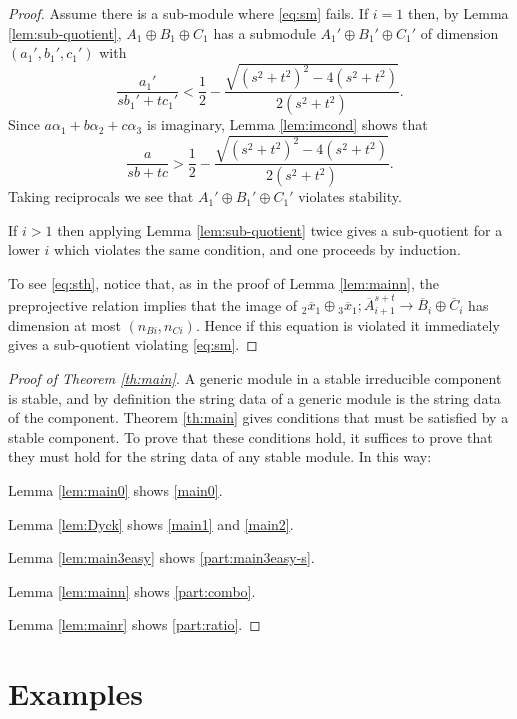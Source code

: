 \documentclass{amsart}
\numberwithin{equation}{section}
\numberwithin{figure}{section}
\numberwithin{table}{section}
\theoremstyle{definition}
\begin{document}
\begin{proof}
Assume there is a sub-module where \eqref{eq:sm} fails. 
If $i=1$ then, by Lemma \ref{lem:sub-quotient}, 
$ A_1 \oplus B_1 \oplus C_1$ has a submodule $A_1'\oplus B_1'\oplus C_1'$ of dimension $(a_1',b_1',c_1')$ with 
 $$\frac{a_1'}{sb_1'+tc_1'}  < \frac{1}{2}-\frac{\sqrt{(s^2+t^2)^2-4(s^2+t^2)}}{2(s^2+t^2)}.$$
Since $a \alpha_1+b\alpha_2+c\alpha_3$ is imaginary, Lemma \ref{lem:imcond} shows that
$$ \frac{a}{sb+tc}> \frac{1}{2}-\frac{\sqrt{(s^2+t^2)^2-4(s^2+t^2)}}{2(s^2+t^2)}.$$
Taking reciprocals we see that  $A_1'\oplus B_1'\oplus C_1'$ violates stability. 

If $i>1$ then applying Lemma \ref{lem:sub-quotient} twice gives a sub-quotient for a lower $i$ which violates the same condition, and one proceeds by induction. 

To see \eqref{eq:sth}, notice that, as in the proof of Lemma \ref{lem:mainn}, the preprojective relation implies that the image of ${}_2 \overline x_1 \oplus {}_3 \overline x_1; \overline A_{i+1}^{s+t} \rightarrow  \overline B_i\oplus \overline C_i$ has dimension at most $(n_{Bi}, n_{Ci})$. Hence if this equation is violated it immediately gives a sub-quotient violating \eqref{eq:sm}.
\end{proof}

\begin{proof}[Proof of  Theorem \ref{th:main}] 
A generic module in a stable irreducible component is stable, and by definition the string data of a generic module is the string data of the component. Theorem \ref{th:main} gives conditions that must be satisfied by a stable component. To prove that these conditions hold, it suffices to prove that they must hold for the string data of any stable module. In this way:

Lemma \ref{lem:main0} shows \eqref{main0}. 

Lemma \ref{lem:Dyck} shows \eqref{main1} and \eqref{main2}.

Lemma \ref{lem:main3easy} shows \eqref{part:main3easy-s}.

Lemma \ref{lem:mainn} shows \eqref{part:combo}.

Lemma \ref{lem:mainr} shows \eqref{part:ratio}.
\end{proof}

\section{Examples}
\end{document}
